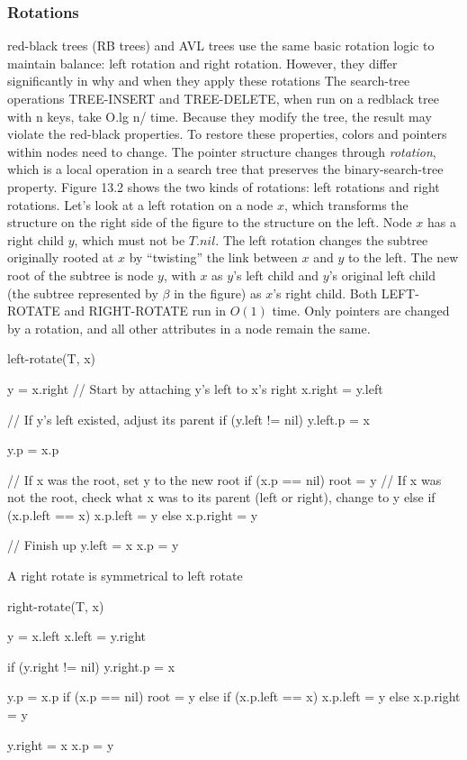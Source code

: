 \documentclass{report}
\begin{document}
 \bigbreak \noindent 
 \subsubsection{Rotations}
 \bigbreak \noindent 
 red-black trees (RB trees) and AVL trees use the same basic rotation logic to maintain balance: left rotation and right rotation. However, they differ significantly in why and when they apply these rotations
 \bigbreak \noindent 
 The search-tree operations TREE-INSERT and TREE-DELETE, when run on a redblack tree with n keys, take O.lg n/ time. Because they modify the tree, the result may violate the red-black properties. To restore these properties, colors and pointers within nodes need to change.
 \bigbreak \noindent 
 The pointer structure changes through \textit{rotation}, which is a local operation in a search tree that preserves the binary-search-tree property. Figure 13.2 shows the two kinds of rotations: left rotations and right rotations. Let’s look at a left rotation on a node $x$, which transforms the structure on the right side of the figure to the structure on the left. Node $x$ has a right child $y$, which must not be $T.nil$. The left rotation changes the subtree originally rooted at $x$ by “twisting” the link between $x$ and $y$ to the left. The new root of the subtree is node $y$, with $x$ as $y$’s left child and $y$’s original left child (the subtree represented by $\beta$ in the figure) as $x$’s right child.
 \bigbreak \noindent 
 Both LEFT-ROTATE and RIGHT-ROTATE run in $O(1)$ time. Only pointers are changed by a rotation, and all other attributes in a node remain the same.
 \bigbreak \noindent 
 \begin{cppcode}
    left-rotate(T, x) {
        y = x.right
        // Start by attaching y's left to x's right
        x.right = y.left

        // If y's left existed, adjust its parent
        if (y.left != nil)
            y.left.p = x

        y.p = x.p

        // If x was the root, set y to the new root
        if (x.p == nil) 
            root = y
        // If x was not the root, check what x was to its parent (left or right), change to y
        else if (x.p.left == x) 
            x.p.left = y
        else 
            x.p.right = y

        // Finish up
        y.left = x
        x.p = y
    }
 \end{cppcode}
 \bigbreak \noindent 
 A right rotate is symmetrical to left rotate
 \bigbreak \noindent 
 \begin{cppcode}
     right-rotate(T, x) {
        y = x.left
        x.left = y.right

        if (y.right != nil) 
            y.right.p = x

        y.p = x.p
        if (x.p == nil)
            root = y
        else if (x.p.left == x)
            x.p.left = y
        else 
            x.p.right = y

        y.right = x
        x.p = y
     }
 \end{cppcode}
\end{document}
